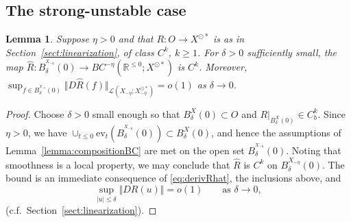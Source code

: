 \documentclass[a4paper, 12pt, oneside, reqno, notitlepage]{amsart}
\theoremstyle{plain}
\newtheorem{lemma}[theorem]{Lemma}
\theoremstyle{definition}
\theoremstyle{remark}
\begin{document}
\subsection{The strong-unstable case}

\begin{lemma} \label{lemma:Rsmoothness}
    Suppose $\eta>0$ and that $R:O \to X^{\odot*}$ is as in Section~\ref{sect:linearization}, of class $C^k$, $k \geq 1$.
    For $\delta > 0$ sufficiently small, the map $\widehat{R}:B_\delta^{^{X_{-\eta}}}(0) \to BC^{-\eta} (\mathbb{R}^{\leq 0};X^{\odot *})$ is $C^k$.
    Moreover, $\sup_{f \in B_\delta^{^{X_{-\eta}}}(0)}\Vert D \widehat{R}(f) \Vert_{\mathcal{L}(X_{-\eta};X_{-\eta}^{\odot *})} = o(1)$ as $\delta \to 0$.
\end{lemma}

\begin{proof}
    Choose $\delta>0$ small enough so that $B_\delta^X(0) \subset O$ and $R|_{B_\delta^X(0)} \in C^k_b$.
    Since $\eta > 0$, we have $\cup_{t\leq0} \mathrm{ev}_t (B_\delta^{^{X_{-\eta}}}(0)) \subset B_\delta^X(0)$, and
    hence the assumptions of Lemma~\ref{lemma:compositionBC} are  met on the open set $B_\delta^{^{X_{-\eta}}}(0)$. 
    Noting that smoothness is a local property, 
    we may conclude that $\widehat{R}$ is $C^k$ on $B_\delta^{X_{-\eta} }(0)$.
    The bound is an immediate consequence of \eqref{eq:derivRhat}, the inclusions above, and 
    \begin{displaymath}
        \sup_{|u| \leq \delta} \Vert D R(u) \Vert = o(1) \qquad \text{as } \delta \to 0,
    \end{displaymath}
    (c.f.\ Section~\ref{sect:linearization}).
\end{proof}
\end{document}
